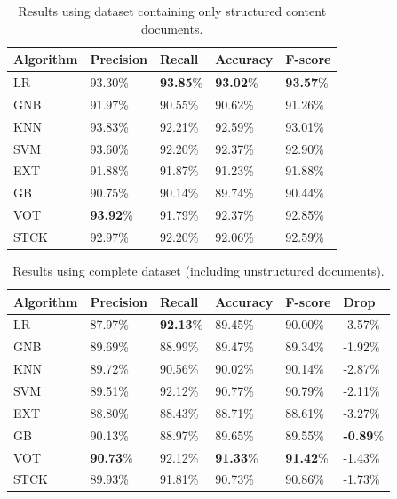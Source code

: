 \begin{table}[h]
\centering
\caption{Results using dataset containing only structured content documents.}
\label{tab:result}
\begin{tabular}{| l | l | l | l | l |}
\hline
Algorithm & Precision & Recall & Accuracy & F-score \\ \hline
LR   & 93.30\% & \textbf{93.85}\% & \textbf{93.02}\% & \textbf{93.57}\% \\
GNB  & 91.97\% & 90.55\% & 90.62\% & 91.26\% \\
KNN  & 93.83\% & 92.21\% & 92.59\% & 93.01\% \\
SVM  & 93.60\% & 92.20\% & 92.37\% & 92.90\% \\
EXT  & 91.88\% & 91.87\% & 91.23\% & 91.88\% \\
GB   & 90.75\% & 90.14\% & 89.74\% & 90.44\% \\
VOT  & \textbf{93.92}\% & 91.79\% & 92.37\% & 92.85\% \\
STCK & 92.97\% & 92.20\% & 92.06\% & 92.59\% \\
\hline
\end{tabular}
\end{table}

\begin{table}[h]
\centering
\caption{Results using complete dataset (including unstructured documents).}
\label{tab:resultnoise}
\begin{tabular}{| l | l | l | l | l | l |}
\hline
Algorithm & Precision & Recall & Accuracy & F-score & Drop \\ \hline
LR   & 87.97\% & \textbf{92.13}\% & 89.45\% & 90.00\% & -3.57\% \\
GNB  & 89.69\% & 88.99\% & 89.47\% & 89.34\% & -1.92\% \\
KNN  & 89.72\% & 90.56\% & 90.02\% & 90.14\% & -2.87\% \\
SVM  & 89.51\% & 92.12\% & 90.77\% & 90.79\% & -2.11\% \\
EXT  & 88.80\% & 88.43\% & 88.71\% & 88.61\% & -3.27\% \\
GB   & 90.13\% & 88.97\% & 89.65\% & 89.55\% & \textbf{-0.89}\% \\
VOT  & \textbf{90.73}\% & 92.12\% & \textbf{91.33}\% & \textbf{91.42}\% & -1.43\% \\
STCK & 89.93\% & 91.81\% & 90.73\% & 90.86\% & -1.73\% \\
\hline
\end{tabular}
\end{table}

